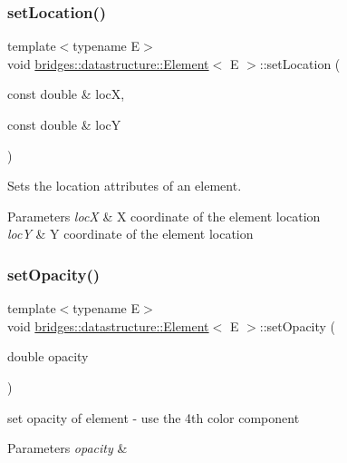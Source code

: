 \subsubsection{\texorpdfstring{set\+Location()}{setLocation()}}
{\footnotesize\ttfamily template$<$typename E$>$ \\
void \mbox{\hyperlink{classbridges_1_1datastructure_1_1_element}{bridges\+::datastructure\+::\+Element}}$<$ E $>$\+::set\+Location (\begin{DoxyParamCaption}\item[{const double \&}]{locX,  }\item[{const double \&}]{locY }\end{DoxyParamCaption})\hspace{0.3cm}{\ttfamily [inline]}}

Sets the location attributes of an element.


\begin{DoxyParams}{Parameters}
{\em locX} & X coordinate of the element location \\
\hline
{\em locY} & Y coordinate of the element location \\
\hline
\end{DoxyParams}
\mbox{\label{classbridges_1_1datastructure_1_1_element_acb5d0b5734a6b3c17b7b1784ae1dc79c}} 
\subsubsection{\texorpdfstring{set\+Opacity()}{setOpacity()}}
{\footnotesize\ttfamily template$<$typename E$>$ \\
void \mbox{\hyperlink{classbridges_1_1datastructure_1_1_element}{bridges\+::datastructure\+::\+Element}}$<$ E $>$\+::set\+Opacity (\begin{DoxyParamCaption}\item[{double}]{opacity }\end{DoxyParamCaption})\hspace{0.3cm}{\ttfamily [inline]}}

set opacity of element -\/ use the 4th color component


\begin{DoxyParams}{Parameters}
{\em opacity} & \\
\hline
\end{DoxyParams}
\mbox{\label{classbridges_1_1datastructure_1_1_element_a1ef398bf1027244a624575e58a569ed9}} 
